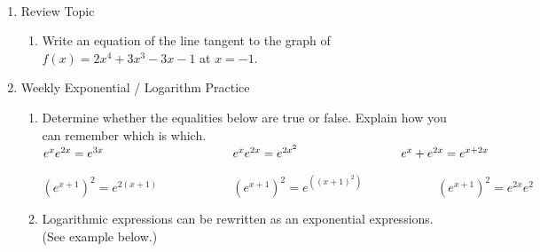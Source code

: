 \documentclass[11pt,fleqn]{article}
\begin{document}
\renewcommand{\headrulewidth}{0pt}
\newcommand{\blank}[1]{\rule{#1}{0.75pt}}
\newcommand{\bc}{\begin{center}}
\newcommand{\ec}{\end{center}}
\renewcommand{\d}{\displaystyle}

\vspace*{-0.7in}

\begin{center}
  \large
  \\ \vfill
\end{center}
\vspace*{-1.5in}
\begin{enumerate}
\item Review Topic
	\begin{enumerate}
	\item Write an equation of the line tangent to the graph of $f(x)=2x^4+3x^3-3x-1$ at $x=-1$.
	\vspace{1in}
	\vfill
	\vspace{0.5in}
	\end{enumerate}

\item Weekly Exponential / Logarithm Practice\\
	\begin{enumerate}
	\item Determine whether the equalities below are true or false. Explain how you can remember which is which.\\
	
	$ e^x e^{2x}=e^{3x} \hspace{1.5in} e^xe^{2x}=e^{2x^2}\hspace{1.2in} e^x+e^{2x}=e^{x+2x}$
	
	\vfill
	$(e^{x+1})^2=e^{2(x+1)} \hspace{1in} (e^{x+1})^2=e^{((x+1)^2)} \hspace{1in} (e^{x+1})^2=e^{2x}e^2$ 
	\vfill
	
\newpage
	\item Logarithmic expressions can be rewritten as an exponential expressions. (See example below.)\\
	

\end{enumerate}
\end{enumerate}
\end{document}
